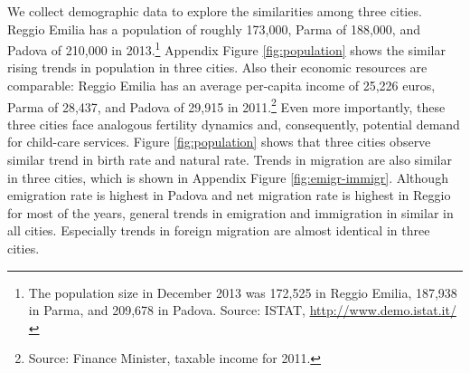 We collect demographic data to explore the similarities among three cities. Reggio Emilia has a population of roughly 173,000, Parma of 188,000, and Padova of 210,000 in 2013.\footnote{The population size in December 2013 was 172,525 in Reggio Emilia, 187,938 in Parma, and 209,678 in Padova. Source: ISTAT, \url{http://www.demo.istat.it/}} Appendix Figure \ref{fig:population} shows the similar rising trends in population in three cities. Also their economic resources are comparable: Reggio Emilia has an average per-capita income of 25,226 euros, Parma of 28,437, and Padova of 29,915 in 2011.\footnote{Source: Finance Minister, taxable income for 2011.} 
Even more importantly, these three cities face analogous fertility dynamics and, consequently, potential demand for child-care services. Figure \ref{fig:population} shows that three cities observe similar trend in birth rate and natural rate. Trends in migration are also similar in three cities, which is shown in Appendix Figure \ref{fig:emigr-immigr}. Although emigration rate is highest in Padova and net migration rate is highest in Reggio for most of the years, general trends in emigration and immigration in similar in all cities. Especially trends in foreign migration are almost identical in three cities.    

 